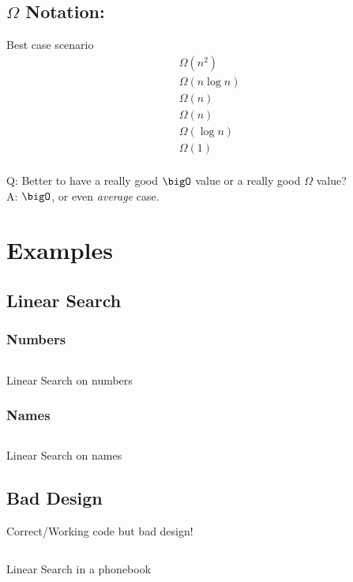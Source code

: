 \subsection{\texorpdfstring{$\Omega$ Notation:}{}} Best case scenario
\begin{align*}
	 & \Omega(n^2)      \\
	 & \Omega(n\log{n}) \\
	 & \Omega(n)        \\
	 & \Omega(n)        \\
	 & \Omega(\log{n})  \\
	 & \Omega(1)        \\
\end{align*}

Q: Better to have a really good $\bigO$ value or a really good $\Omega$ value?\\

A: $\bigO$, or even \emph{average} case.

\clearpage
\section{Examples}
\subsection{Linear Search}
\subsubsection{Numbers}
\begin{code}
	\inputminted[linenos]{c}{codes/src3/numbers.c}
	\caption{Linear Search on numbers}
\end{code}
\subsubsection{Names}
\begin{code}
	\inputminted[linenos]{c}{codes/src3/names0.c}
	\caption{Linear Search on names}
\end{code}
\subsection{Bad Design}
Correct/Working code but bad design!
\begin{code}
	\inputminted[linenos,breaklines]{c}{codes/src3/phonebook0.c}
	\caption{Linear Search in a phonebook}
\end{code}
